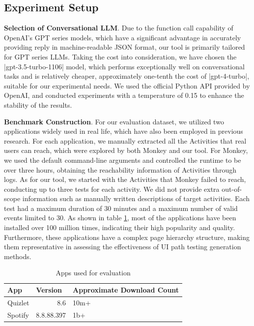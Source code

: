 \documentclass[conference]{IEEEtran}
\begin{document}
\subsection{Experiment Setup}

\textbf{Selection of Conversational LLM}. Due to the function call capability of OpenAI's GPT series models, which have a significant advantage in accurately providing reply in machine-readable JSON format, our tool is primarily tailored for GPT series LLMs. Taking the cost into consideration, we have chosen the \spverb|gpt-3.5-turbo-1106| model, which performs exceptionally well on conversational tasks and is relatively cheaper, approximately one-tenth the cost of \spverb|gpt-4-turbo|, suitable for our experimental needs. We used the official Python API provided by OpenAI, and conducted experiments with a temperature of 0.15 to enhance the stability of the results.

\textbf{Benchmark Construction}. For our evaluation dataset, we utilized two applications widely used in real life, which have also been employed in previous research. For each application, we manually extracted all the Activities that real users can reach, which were explored by both Monkey and our tool. For Monkey, we used the default command-line arguments and controlled the runtime to be over three hours, obtaining the reachability information of Activities through logs. As for our tool, we started with the Activities that Monkey failed to reach, conducting up to three tests for each activity. We did not provide extra out-of-scope information such as manually written descriptions of target activities. Each test had a maximum duration of 30 minutes and a maximum number of valid events limited to 30. As shown in table \ref{tab:apps}, most of the applications have been installed over 100 million times, indicating their high popularity and quality. Furthermore, these applications have a complex page hierarchy structure, making them representative in assessing the effectiveness of UI path testing generation methods.

\begin{table}
    \centering
    \caption{Apps used for evaluation}
    \label{tab:apps}
    \begin{tabular}{|l|l|l|}
    \hline
    \textbf{App} & \textbf{Version}         & \textbf{Approximate Download Count} \\ \hline
    Quizlet           & \multicolumn{1}{r|}{8.6} & 10m+                    \\ \hline
    Spotify           & 8.8.88.397               & 1b+                     \\ \hline
    \end{tabular}
    \end{table}
\end{document}
